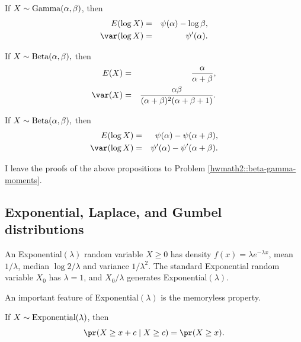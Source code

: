 \begin{proposition}
\label{thm:gammamoments-log}If $X\sim\textup{Gamma}(\alpha,\beta)$,
then
\begin{eqnarray*}
E(\log X)  &=&  \psi(\alpha) - \log \beta ,\\ 
\var(\log X) &=& \psi'(\alpha). 
\end{eqnarray*}
\end{proposition}


\begin{proposition}
\label{thm:beta-moments}If $X\sim\textup{Beta}(\alpha,\beta),$ then
\begin{eqnarray*}
E(X)  &=&  \frac{\alpha}{\alpha+\beta},\\
\var(X) &=& \frac{\alpha\beta}{(\alpha+\beta)^2(\alpha+\beta+1)}.
\end{eqnarray*}
\end{proposition}

\begin{proposition}
\label{thm:beta-moments-log}If $X\sim\textup{Beta}(\alpha,\beta),$ then
\begin{eqnarray*}
E(\log X)  &=& \psi(\alpha) - \psi(\alpha + \beta) ,\\ 
\var(\log X) &=& \psi ' (\alpha) - \psi ' (\alpha + \beta) . 
\end{eqnarray*}
\end{proposition}


%
I leave the proofs of the above propositions to Problem \ref{hwmath2::beta-gamma-moments}. 



\subsection{Exponential, Laplace, and Gumbel distributions}
\label{subsec::expo-gumbel}

An Exponential$(\lambda)$ random variable $X \geq 0$ has density $f(x) = \lambda e^{-\lambda x}$, mean $1/\lambda$, median $\log 2/\lambda $ and variance $1/\lambda^2$.  The standard Exponential random variable $X_0$ has $\lambda = 1$, and $X_0 / \lambda$ generates Exponential$(\lambda)$. 



An important feature of Exponential$(\lambda)$ is the memoryless property.

\begin{proposition}
\label{prop::memoryless}
If $X\sim \textup{Exponential}(\lambda)$, then 
$$
\pr(X \geq x+c \mid X\geq c) =\pr(X \geq x).
$$
\end{proposition}

